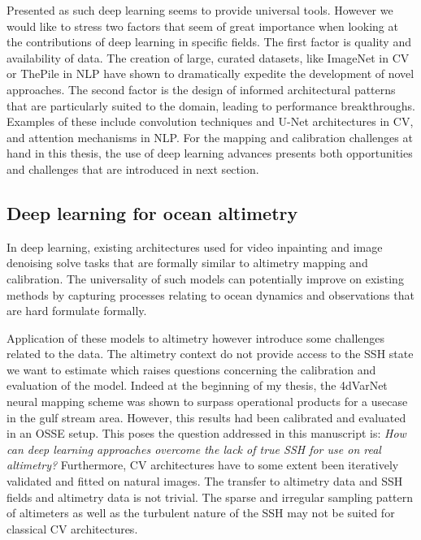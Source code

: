 \begin{bibunit}
Presented as such deep learning seems to provide universal tools.
However we would like to stress two factors that seem of great importance when looking at the contributions of deep learning in specific fields.
The first factor is quality and availability of data.
The creation of large, curated datasets, like ImageNet\cite{dengImageNetLargescaleHierarchical2009} in CV or ThePile\cite{gaoPile800GBDataset2020} in NLP have shown to dramatically expedite the development of novel approaches. 
The second factor is the design of informed architectural patterns that are particularly suited to the domain, leading to performance breakthroughs.
Examples of these include convolution techniques\cite{lecunHandwrittenDigitRecognition1989} and U-Net architectures\cite{ronnebergerUNetConvolutionalNetworks2015} in CV, and attention mechanisms\cite{vaswaniAttentionAllYou} in NLP. 
For the mapping and calibration challenges at hand in this thesis, the use of deep learning advances presents both opportunities and challenges that are introduced in next section.

\subsection*{Deep learning for ocean altimetry}

In deep learning, existing architectures used for video inpainting\cite{kimDeepVideoInpainting} and image denoising\cite{tianDeepLearningImage2020} solve tasks that are formally similar to altimetry mapping and calibration.
The universality of such models can potentially improve on existing methods by capturing processes relating to ocean dynamics and observations that are hard formulate formally.

Application of these models to altimetry however introduce some challenges related to the data.
The altimetry context do not provide access to the SSH state we want to estimate which raises questions concerning the calibration and evaluation of the model.
Indeed at the beginning of my thesis, the 4dVarNet neural mapping scheme was shown to surpass operational products for a usecase in the gulf stream area\cite{fabletENDTOENDPHYSICSINFORMEDREPRESENTATION2021}. However, this results had been calibrated and evaluated in an OSSE setup. 
This poses the question addressed in this manuscript is: \textit{How can deep learning approaches overcome the lack of true SSH for use on real altimetry?}
Furthermore, CV architectures have to some extent been iteratively validated and fitted on natural images.
The transfer to altimetry data and SSH fields and altimetry data is not trivial.
The sparse and irregular sampling pattern of altimeters  as well as the turbulent nature of the SSH may not be suited for classical CV architectures.


\end{bibunit}
